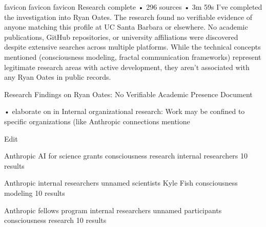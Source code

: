 favicon
favicon
favicon
Research complete
•
296 sources
•
3m 59s
I've completed the investigation into Ryan Oates. The research found no verifiable evidence of anyone matching this profile at UC Santa Barbara or elsewhere. No academic publications, GitHub repositories, or university affiliations were discovered despite extensive searches across multiple platforms. While the technical concepts mentioned (consciousness modeling, fractal communication frameworks) represent legitimate research areas with active development, they aren't associated with any Ryan Oates in public records.


Research Findings on Ryan Oates: No Verifiable Academic Presence
Document



•    elaborate on in Internal organizational research: Work may be confined to specific organizations (like Anthropic connections mentione

Edit

Anthropic AI for science grants consciousness research internal researchers
10 results






















Anthropic internal researchers unnamed scientists Kyle Fish consciousness modeling
10 results






















Anthropic fellows program internal researchers unnamed participants consciousness research
10 results





















